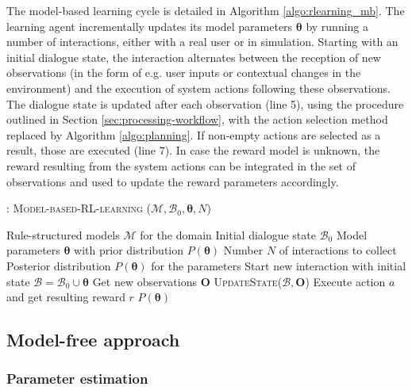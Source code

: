 The model-based learning cycle is detailed in Algorithm \ref{algo:rlearning_mb}. The learning agent incrementally updates its model parameters $\boldsymbol\theta$  by running a number of interactions, either with a real user or in simulation. Starting with an initial dialogue state, the interaction alternates between the reception of new observations (in the form of e.g. user inputs or contextual changes in the environment) and the execution of system actions following these observations.  The dialogue state is updated after each observation (line 5), using the procedure outlined in Section \ref{sec:processing-workflow}, with the action selection method replaced by Algorithm \ref{algo:planning}. If non-empty actions are selected as a result, those are executed (line 7).   In case the reward model is unknown, the reward resulting from the system actions can be integrated in the set of observations and used to update the reward parameters accordingly. 

\begin{algorithm}[h]
\caption{: \textsc{Model-based-RL-learning} ($\mathcal{M}, \mathcal{B}_0, \boldsymbol\theta, N$)}
\begin{algorithmic}[1]\vspace{1mm}
\REQUIRE Rule-structured models $\mathcal{M}$ for the domain
\REQUIRE Initial dialogue state $\mathcal{B}_0$
\REQUIRE Model parameters $\boldsymbol\theta$ with prior distribution $P(\boldsymbol\theta)$
\REQUIRE Number $N$ of interactions to collect
\ENSURE Posterior distribution $P(\boldsymbol\theta)$ for the parameters  \vspace{1mm}
\STATE Start new interaction with initial state $\mathcal{B} = \mathcal{B}_0 \cup \boldsymbol\theta $
\STATE Get new observations $\mathbf{O}$
\STATE \textsc{UpdateState}($\mathcal{B}, \mathbf{O}$)
\STATE Execute action $a$ and get resulting reward $r$
\ENDIF
\ENDWHILE
\ENDFOR
\RETURN $P(\boldsymbol\theta)$
\end{algorithmic} 
\label{algo:rlearning_mb}
\end{algorithm}



\subsection{Model-free approach}

\subsubsection*{Parameter estimation}

